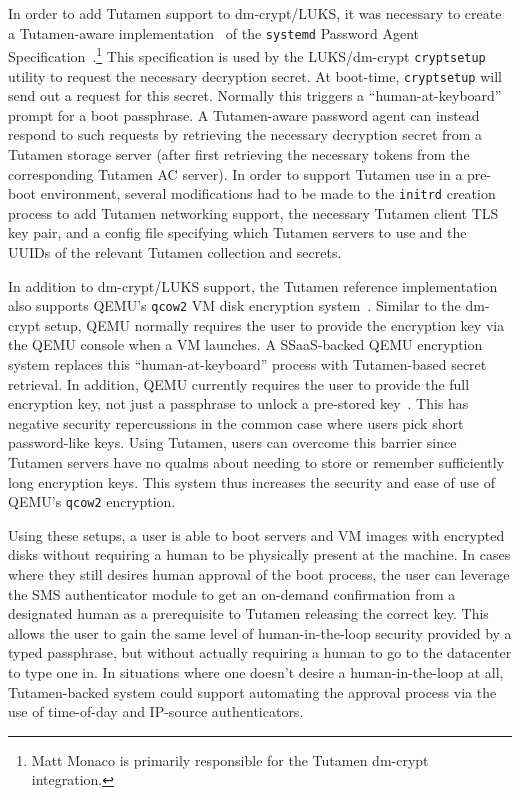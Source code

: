 In order to add Tutamen support to dm-crypt/LUKS, it was necessary to
create a Tutamen-aware implementation~\cite{src-tutamen-askpassword}
of the \texttt{systemd} Password Agent
Specification~\cite{systemd-passwordagents}.\footnote{Matt Monaco is
  primarily responsible for the Tutamen dm-crypt integration.}  This
specification is used by the LUKS/dm-crypt \texttt{cryptsetup} utility
to request the necessary decryption secret. At boot-time,
\texttt{cryptsetup} will send out a request for this secret. Normally
this triggers a ``human-at-keyboard'' prompt for a boot passphrase. A
Tutamen-aware password agent can instead respond to such requests by
retrieving the necessary decryption secret from a Tutamen storage
server (after first retrieving the necessary tokens from the
corresponding Tutamen AC server). In order to support Tutamen use in a
pre-boot environment, several modifications had to be made to the
\texttt{initrd} creation process to add Tutamen networking support,
the necessary Tutamen client TLS key pair, and a config file
specifying which Tutamen servers to use and the UUIDs of the relevant
Tutamen collection and secrets.

In addition to dm-crypt/LUKS support, the Tutamen reference
implementation also supports QEMU's \texttt{qcow2} VM disk encryption
system~\cite{src-qemu-tutamen}. Similar to the dm-crypt setup, QEMU
normally requires the user to provide the encryption key via the QEMU
console when a VM launches. A SSaaS-backed QEMU encryption system
replaces this ``human-at-keyboard'' process with Tutamen-based secret
retrieval. In addition, QEMU currently requires the user to provide
the full encryption key, not just a passphrase to unlock a pre-stored
key~\cite{berrange-qemucrypto}. This has negative security
repercussions in the common case where users pick short password-like
keys. Using Tutamen, users can overcome this barrier since Tutamen
servers have no qualms about needing to store or remember sufficiently
long encryption keys. This system thus increases the security and ease
of use of QEMU's \texttt{qcow2} encryption.

Using these setups, a user is able to boot servers and VM images with
encrypted disks without requiring a human to be physically present at
the machine. In cases where they still desires human approval of the
boot process, the user can leverage the SMS authenticator module to
get an on-demand confirmation from a designated human as a
prerequisite to Tutamen releasing the correct key. This allows the
user to gain the same level of human-in-the-loop security provided by
a typed passphrase, but without actually requiring a human to go to
the datacenter to type one in. In situations where one doesn't desire
a human-in-the-loop at all, Tutamen-backed system could support
automating the approval process via the use of time-of-day and
IP-source authenticators.

